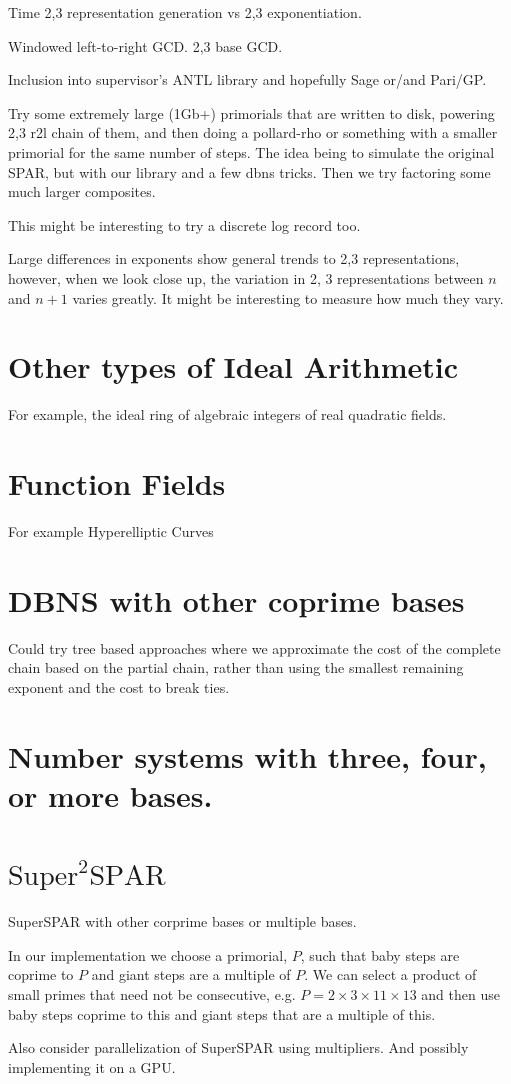 \documentclass{ucalgthes1}
\theoremstyle{definition}
\begin{document}
Time 2,3 representation generation vs 2,3 exponentiation.

Windowed left-to-right GCD.
2,3 base GCD.

Inclusion into supervisor's ANTL library and hopefully Sage or/and Pari/GP.

Try some extremely large (1Gb+) primorials that are written to disk, powering 2,3 r2l chain of them, and then doing a pollard-rho or something with a smaller primorial for the same number of steps.  The idea being to simulate the original SPAR, but with our library and a few dbns tricks.  Then we try factoring some much larger composites.

This might be interesting to try a discrete log record too.

Large differences in exponents show general trends to 2,3 representations, however, when we look close up, the variation in 2, 3 representations between $n$ and $n+1$ varies greatly.  It might be interesting to measure how much they vary.  

\section{Other types of Ideal Arithmetic}
For example, the ideal ring of algebraic integers of real quadratic fields.

\section{Function Fields}

For example Hyperelliptic Curves

\section{DBNS with other coprime bases}

Could try tree based approaches where we approximate the cost of the complete chain based on the partial chain, rather than using the smallest remaining exponent and the cost to break ties.

\section{Number systems with three, four, or more bases.}

\section{$\textrm{Super}^2\textrm{SPAR}$}

SuperSPAR with other corprime bases or multiple bases.

In our implementation we choose a primorial, $P$, such that baby steps are coprime to $P$ and giant steps are a multiple of $P$.  We can select a product of small primes that need not be consecutive, e.g. $P = 2 \times 3 \times 11 \times 13$ and then use baby steps coprime to this and giant steps that are a multiple of this.

Also consider parallelization of SuperSPAR using multipliers.  And possibly implementing it on a GPU.




\end{document}
